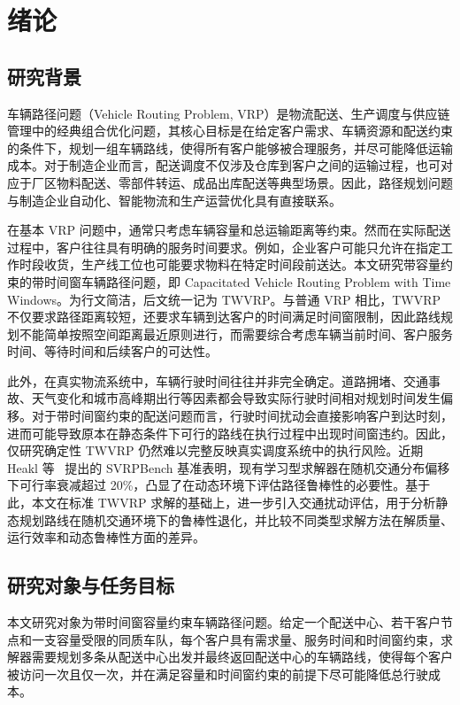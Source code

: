 \documentclass[12pt,a4paper,UTF8]{article}
\begin{document}

\maketoc    %
\section{绪论}
\label{sec:intro}
\subsection{研究背景}
车辆路径问题（Vehicle Routing Problem, VRP）是物流配送、生产调度与供应链管理中的经典组合优化问题，其核心目标是在给定客户需求、车辆资源和配送约束的条件下，规划一组车辆路线，使得所有客户能够被合理服务，并尽可能降低运输成本。对于制造企业而言，配送调度不仅涉及仓库到客户之间的运输过程，也可对应于厂区物料配送、零部件转运、成品出库配送等典型场景。因此，路径规划问题与制造企业自动化、智能物流和生产运营优化具有直接联系。

在基本 VRP 问题中，通常只考虑车辆容量和总运输距离等约束。然而在实际配送过程中，客户往往具有明确的服务时间要求。例如，企业客户可能只允许在指定工作时段收货，生产线工位也可能要求物料在特定时间段前送达。本文研究带容量约束的带时间窗车辆路径问题，即 Capacitated Vehicle Routing Problem with Time Windows。为行文简洁，后文统一记为 TWVRP。与普通 VRP 相比，TWVRP 不仅要求路径距离较短，还要求车辆到达客户的时间满足时间窗限制，因此路线规划不能简单按照空间距离最近原则进行，而需要综合考虑车辆当前时间、客户服务时间、等待时间和后续客户的可达性。

此外，在真实物流系统中，车辆行驶时间往往并非完全确定。道路拥堵、交通事故、天气变化和城市高峰期出行等因素都会导致实际行驶时间相对规划时间发生偏移。对于带时间窗约束的配送问题而言，行驶时间扰动会直接影响客户到达时刻，进而可能导致原本在静态条件下可行的路线在执行过程中出现时间窗违约。因此，仅研究确定性 TWVRP 仍然难以完整反映真实调度系统中的执行风险。近期 Heakl 等~\cite{heakl2025svrpbench} 提出的 SVRPBench 基准表明，现有学习型求解器在随机交通分布偏移下可行率衰减超过 20\%，凸显了在动态环境下评估路径鲁棒性的必要性。基于此，本文在标准 TWVRP 求解的基础上，进一步引入交通扰动评估，用于分析静态规划路线在随机交通环境下的鲁棒性退化，并比较不同类型求解方法在解质量、运行效率和动态鲁棒性方面的差异。

\subsection{研究对象与任务目标}
本文研究对象为带时间窗容量约束车辆路径问题。给定一个配送中心、若干客户节点和一支容量受限的同质车队，每个客户具有需求量、服务时间和时间窗约束，求解器需要规划多条从配送中心出发并最终返回配送中心的车辆路线，使得每个客户被访问一次且仅一次，并在满足容量和时间窗约束的前提下尽可能降低总行驶成本。
\end{document}
